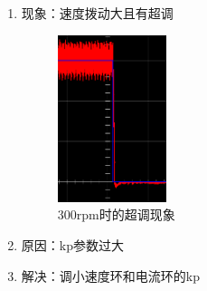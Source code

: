 \documentclass[main.tex]{subfiles}
\begin{document}
\begin{enumerate}
    \item 现象：速度拨动大且有超调
    \begin{figure}[H]
        \centering
        \includegraphics[width=0.3\textwidth]{img/img_1.4.4.png}
        \caption{300rpm时的超调现象}
        \label{PID params is not correct}
    \end{figure}
    \item 原因：kp参数过大
    \item 解决：调小速度环和电流环的kp
\end{enumerate}
\end{document}
